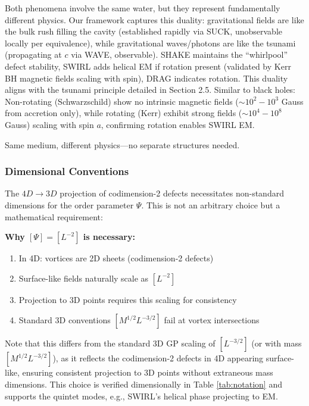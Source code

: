 Both phenomena involve the same water, but they represent fundamentally different physics. Our framework captures this duality: gravitational fields are like the bulk rush filling the cavity (established rapidly via SUCK, unobservable locally per equivalence), while gravitational waves/photons are like the tsunami (propagating at $c$ via WAVE, observable). SHAKE maintains the ``whirlpool'' defect stability, SWIRL adds helical EM if rotation present (validated by Kerr BH magnetic fields scaling with spin), DRAG indicates rotation. This duality aligns with the tsunami principle detailed in Section 2.5. Similar to black holes: Non-rotating (Schwarzschild) show no intrinsic magnetic fields ($\sim 10^2 - 10^3$ Gauss from accretion only), while rotating (Kerr) exhibit strong fields ($\sim 10^4 - 10^8$ Gauss) scaling with spin $a$, confirming rotation enables SWIRL EM.

Same medium, different physics---no separate structures needed.

\medskip
{}

\subsubsection{Dimensional Conventions}

The $4D\to3D$ projection of codimension-2 defects necessitates non-standard dimensions for the order parameter $\Psi$. This is not an arbitrary choice but a mathematical requirement:

\textbf{Why $[\Psi] = [L^{-2}]$ is necessary:}
\begin{enumerate}
\item In 4D: vortices are 2D sheets (codimension-2 defects)
\item Surface-like fields naturally scale as $[L^{-2}]$
\item Projection to 3D points requires this scaling for consistency
\item Standard 3D conventions $[M^{1/2} L^{-3/2}]$ fail at vortex intersections
\end{enumerate}

Note that this differs from the standard 3D GP scaling of $[L^{-3/2}]$ (or with mass $[M^{1/2} L^{-3/2}]$), as it reflects the codimension-2 defects in 4D appearing surface-like, ensuring consistent projection to 3D points without extraneous mass dimensions. This choice is verified dimensionally in Table \ref{tab:notation} and supports the quintet modes, e.g., SWIRL's helical phase projecting to EM.

